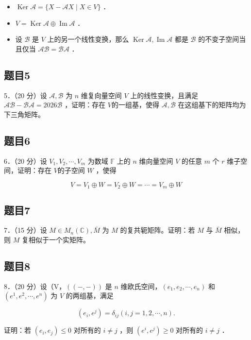 \documentclass{article}
\begin{document}
\begin{itemize}
  \item[（1）] \(\operatorname{Ker} \mathcal{A}=\{X-\mathcal{A} X \mid X \in V\}\) ．
  \item[（2）] \(V=\operatorname{Ker} \mathcal{A} \oplus \operatorname{Im} \mathcal{A}\) ．
  \item[（3）] 设 \(\mathcal{B}\) 是 \(V\) 上的另一个线性变换，那么 \(\operatorname{Ker} \mathcal{A}, \operatorname{Im} \mathcal{A}\) 都是 \(\mathcal{B}\) 的不变子空间当且仅当 \(\mathcal{A} \mathcal{B}=\mathcal{B} \mathcal{A}\) ．
\end{itemize}

\subsection{题目5}
5．（20 分）设 \(\mathcal{A}, \mathcal{B}\) 为 \(n\) 维复向量空间 \(V\) 上的线性变换，且满足 \(\mathcal{A} \mathcal{B}-\mathcal{B} \mathcal{A}=2026 \mathcal{B}\) ，证明：存在 \(V\)的一组基，使得 \(\mathcal{A}, \mathcal{B}\) 在这组基下的矩阵均为下三角矩阵。

\subsection{题目6}
6．（20 分）设 \(V_{1}, V_{2}, \cdots, V_{m}\) 为数域 \(\mathbb{F}\) 上的 \(n\) 维向量空间 \(V\) 的任意 \(m\) 个 \(r\) 维子空间，证明：存在 \(V\)的子空间 \(W\) ，使得

\[
V=V_{1} \oplus W=V_{2} \oplus W=\cdots=V_{m} \oplus W
\]

\subsection{题目7}
7．（15 分）设 \(M \in M_{n}(\mathbb{C}), \bar{M}\) 为 \(M\) 的复共轭矩阵。证明：若 \(M\) 与 \(\bar{M}\) 相似，则 \(M\) 复相似于一个实矩阵。

\subsection{题目8}
8．（20 分）设（V，\(((-,-))\) 是 \(n\) 维欧氏空间，\(\left(e_{1}, e_{2}, \cdots, e_{n}\right)\) 和 \(\left(e^{1}, e^{2}, \cdots, e^{n}\right)\) 为 \(V\) 的两组基，满足

\[
\left(e_{i}, e^{j}\right)=\delta_{i j}(i, j=1,2, \cdots, n) .
\]

证明：若 \(\left(e_{i}, e_{j}\right) \leq 0\) 对所有的 \(i \neq j\) ，则 \(\left(e^{i}, e^{j}\right) \geq 0\) 对所有的 \(i \neq j\) ．
\end{document}
